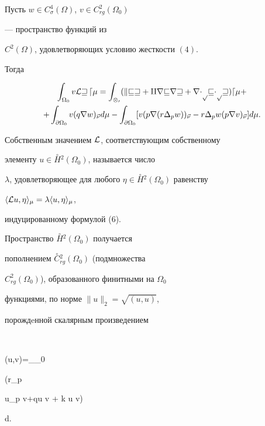 \begin{lem} 


Пусть $w\in C^4_\sigma(\Omega)$, $v\in C^2_{rg}(\Omega_0)$


--- пространство функций из 


$C^2(\Omega)$, удовлетворяющих условию жесткости $(4)$.


Тогда 


\begin{multline} 


\int_{\Omega_0}v\cal L w\,d\mu=\int_{\Omega_0} 


(k v w+q\nabla v\nabla w+r\Delta_p v\Delta_p w)d\mu+ \\ 


% 


+\int_{\partial\Omega_0}v(q\nabla w)_{\Vec\nu}d\mu- 


\int_{\partial\Omega_0}[v(p\nabla(r\Delta_p w))_{\Vec\nu} 


-r\Delta_p w(p\nabla v)_{\Vec \nu}]d\mu. 


\end{multline} 


\end{lem} 


 


Собственным значением ${\cal L}$, соответствующим собственному 


элементу $u \in \overset{\circ}{H}{}^2(\Omega_0)$, называется число 


$\lambda$, удовлетворяющее для любого $\eta \in 


\overset{\circ}{H}{}^2(\Omega_0)$ равенству 


$\langle{\cal L}u,\eta\rangle_\mu=\lambda\langle u,\eta\rangle_\mu$, 


индуцированному формулой (6). 


 


Пространство $\overset{\circ}{H}{}^2(\Omega_0)$ получается 


пополнением $\overset{\circ}{C}{}^2_{rg}(\Omega_0)$ (подмножества 


$C^2_{rg}(\Omega_0)$), образованного финитными на $\Omega_0$ 


функциями, по норме $\|u\|_2=\sqrt{(u,u)}$, 


порождeнной скалярным произведением 


$$


(u,v)=\int_{\Omega_0}{(r\Delta_p 


u\Delta_p v+q\nabla u \nabla v + k u v)}d\mu. 


